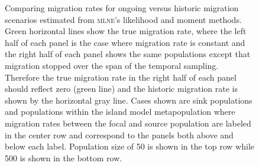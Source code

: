 \begin{figure}[ht]
\centering
{}
\caption[ ~~~ - Comparing migration rates for ongoing versus historic migration scenarios.]{Comparing migration rates for ongoing versus historic migration scenarios estimated from \textsc{mlne}'s likelihood and moment methods. Green horizontal lines show the true migration rate, where the left half of each panel is the case where migration rate is constant and the right half of each panel shows the same populations except that migration stopped over the span of the temporal sampling. Therefore the true migration rate in the right half of each panel should reflect zero (green line) and the historic migration rate is shown by the horizontal gray line. Cases shown are sink populations and populations within the island model metapopulation where migration rates between the focal and source population are labeled in the center row and correspond to the panels both above and below each label. Population size of 50 is shown in the top row while 500 is shown in the bottom row.}
\label{fig:supp_compmig}
\end{figure}